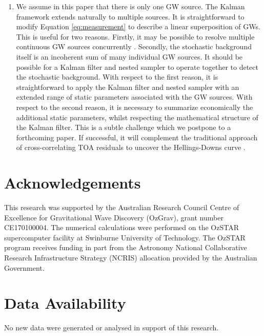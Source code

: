 \documentclass[fleqn,usenatbib,useAMS]{mnras}
\begin{document}
\begin{enumerate}[leftmargin=2em]
	
	\item We assume in this paper that there is only one GW source. The Kalman framework extends naturally to multiple sources. It is straightforward to modify Equation \eqref{eq:measurement} to describe a linear superposition of GWs. This is useful for two reasons. Firstly, it may be possible to resolve multiple continuous GW sources concurrently \citep{PhysRevD.85.044034}. Secondly, the stochastic background itself is an incoherent sum of many individual GW sources. It should be possible for a Kalman filter and nested sampler to operate together to detect the stochastic background. With respect to the first reason, it is straightforward to apply the Kalman filter and nested sampler with an extended range of static parameters associated with the GW sources. With respect to the second reason, it is necessary to summarize economically the additional static parameters, whilst respecting the mathematical structure of the Kalman filter. This is a subtle challenge which we postpone to a forthcoming paper. If successful, it will complement the traditional approach of cross-correlating TOA residuals to uncover the Hellings-Downs curve \citep{Hellings,2023ApJ...951L...8A}.
\end{enumerate}







\section*{Acknowledgements}
This research was supported by the Australian Research Council Centre of Excellence for Gravitational Wave Discovery (OzGrav), grant number CE170100004. The numerical calculations were performed on the OzSTAR supercomputer facility at Swinburne University of Technology. The OzSTAR program receives funding in part from the Astronomy National Collaborative Research Infrastructure Strategy (NCRIS) allocation provided by the Australian Government.


\section*{Data Availability}
No new data were generated or analysed in support of this research.


\end{document}
